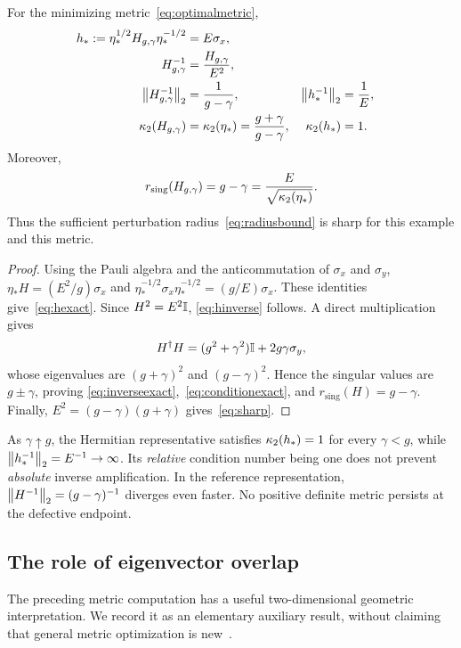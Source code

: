 \begin{proposition}
\label{prop:modelsharp}
For the minimizing metric~\eqref{eq:optimalmetric},
\begin{align}
 h_*:=\eta_*^{1/2}H_{g,\gamma}\eta_*^{-1/2}
 &=E\sigma_x, \label{eq:hexact}\\
 H_{g,\gamma}^{-1}&=\frac{H_{g,\gamma}}{E^2},\label{eq:hinverse}\\
 \left\lVert H_{g,\gamma}^{-1}\right\rVert_2&=\frac{1}{g-\gamma},
 &\left\lVert h_*^{-1}\right\rVert_2&=\frac{1}{E},\label{eq:inverseexact}\\
 \kappa_2(H_{g,\gamma})&=\kappa_2(\eta_*)=\frac{g+\gamma}{g-\gamma},
 &\kappa_2(h_*)&=1.\label{eq:conditionexact}
\end{align}
Moreover,
\begin{equation}\label{eq:sharp}
 r_{\mathrm{sing}}(H_{g,\gamma})=g-\gamma
 =\frac{E}{\sqrt{\kappa_2(\eta_*)}}.
\end{equation}
Thus the sufficient perturbation radius~\eqref{eq:radiusbound} is sharp
for this example and this metric.
\end{proposition}
\begin{proof}
Using the Pauli algebra and the anticommutation of $\sigma_x$ and $\sigma_y$,
$\eta_* H=(E^2/g)\sigma_x$ and
$\eta_*^{-1/2}\sigma_x\eta_*^{-1/2}=(g/E)\sigma_x$.
These identities give~\eqref{eq:hexact}. Since $H^2=E^2\mathbb{I}$,
\eqref{eq:hinverse} follows. A direct multiplication gives
\begin{equation}
 H^\dagger H=(g^2+\gamma^2)\mathbb{I}+2g\gamma\sigma_y,
\end{equation}
whose eigenvalues are $(g+\gamma)^2$ and $(g-\gamma)^2$.
Hence the singular values are $g\pm\gamma$, proving
\eqref{eq:inverseexact},~\eqref{eq:conditionexact}, and
$r_{\mathrm{sing}}(H)=g-\gamma$. Finally,
$E^2=(g-\gamma)(g+\gamma)$ gives~\eqref{eq:sharp}.
\end{proof}

\begin{remark}
As $\gamma\uparrow g$, the Hermitian representative satisfies
$\kappa_2(h_*)=1$ for every $\gamma<g$, while
$\left\lVert h_*^{-1}\right\rVert_2=E^{-1}\to\infty$.
Its \emph{relative} condition number being one does not prevent
\emph{absolute} inverse amplification. In the reference representation,
$\left\lVert H^{-1}\right\rVert_2=(g-\gamma)^{-1}$ diverges even faster.
No positive definite metric persists at the defective endpoint.
\end{remark}

\subsection{The role of eigenvector overlap}
The preceding metric computation has a useful two-dimensional geometric
interpretation. We record it as an elementary auxiliary result, without
claiming that general metric optimization is new~\cite{Krejcirik2018}.

